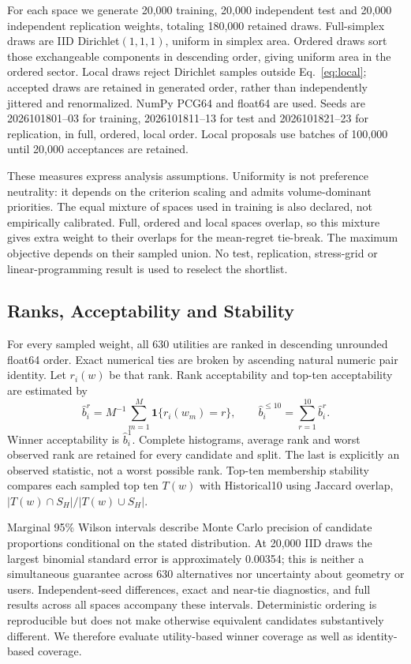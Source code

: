\documentclass{llncs}
\newcommand{\ind}{\mathbf{1}}
\begin{document}
For each space we generate 20,000 training, 20,000 independent test and 20,000 independent replication weights, totaling 180,000 retained draws. Full-simplex draws are IID Dirichlet$(1,1,1)$, uniform in simplex area. Ordered draws sort those exchangeable components in descending order, giving uniform area in the ordered sector. Local draws reject Dirichlet samples outside Eq.~\ref{eq:local}; accepted draws are retained in generated order, rather than independently jittered and renormalized. NumPy PCG64 and float64 are used. Seeds are 2026101801--03 for training, 2026101811--13 for test and 2026101821--23 for replication, in full, ordered, local order. Local proposals use batches of 100,000 until 20,000 acceptances are retained.

These measures express analysis assumptions. Uniformity is not preference neutrality: it depends on the criterion scaling and admits volume-dominant priorities. The equal mixture of spaces used in training is also declared, not empirically calibrated. Full, ordered and local spaces overlap, so this mixture gives extra weight to their overlaps for the mean-regret tie-break. The maximum objective depends on their sampled union. No test, replication, stress-grid or linear-programming result is used to reselect the shortlist.

\subsection{Ranks, Acceptability and Stability}
For every sampled weight, all 630 utilities are ranked in descending unrounded float64 order. Exact numerical ties are broken by ascending natural numeric pair identity. Let $r_i(w)$ be that rank. Rank acceptability and top-ten acceptability are estimated by
\begin{equation}
 \widehat b_i^r=M^{-1}\sum_{m=1}^M\ind\{r_i(w_m)=r\},\qquad
 \widehat b_i^{\leq10}=\sum_{r=1}^{10}\widehat b_i^r.
\label{eq:acceptability}
\end{equation}
Winner acceptability is $\widehat b_i^1$. Complete histograms, average rank and worst observed rank are retained for every candidate and split. The last is explicitly an observed statistic, not a worst possible rank. Top-ten membership stability compares each sampled top ten $T(w)$ with Historical10 using Jaccard overlap, $|T(w)\cap S_H|/|T(w)\cup S_H|$.

Marginal 95\% Wilson intervals describe Monte Carlo precision of candidate proportions conditional on the stated distribution. At 20,000 IID draws the largest binomial standard error is approximately 0.00354; this is neither a simultaneous guarantee across 630 alternatives nor uncertainty about geometry or users. Independent-seed differences, exact and near-tie diagnostics, and full results across all spaces accompany these intervals. Deterministic ordering is reproducible but does not make otherwise equivalent candidates substantively different. We therefore evaluate utility-based winner coverage as well as identity-based coverage.
\end{document}
